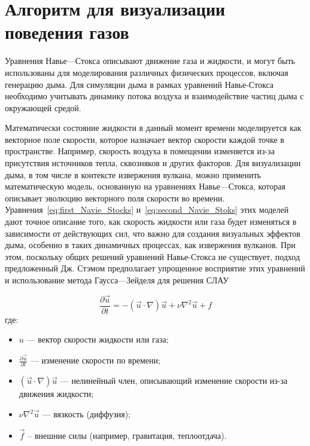 \section{Алгоритм для визуализации поведения газов}
Уравнения Навье---Стокса описывают движение газа и жидкости, и могут быть использованы для моделирования различных физических процессов, включая генерацию дыма. Для симуляции дыма в рамках уравнений Навье-Стокса необходимо учитывать динамику потока воздуха и взаимодействие частиц дыма с окружающей средой.

Математически состояние жидкости в данный момент времени моделируется как векторное поле скорости, которое назначает вектор скорости каждой точке в пространстве. Например, скорость воздуха в помещении изменяется из-за присутствия источников тепла, сквозняков и других факторов. Для визуализации дыма, в том числе в контексте извержения вулкана, можно применить математическую модель, основанную на уравнениях Навье---Стокса, которая описывает эволюцию векторного поля скорости во времени. Уравнения~\ref{eq:first_Navie_Stocks} и~\ref{eq:second_Navie_Stoks} этих моделей дают точное описание того, как скорость жидкости или газа будет изменяться в зависимости от действующих сил, что важно для создания визуальных эффектов дыма, особенно в таких динамичных процессах, как извержения вулканов. При этом, поскольку общих решений уравнений Навье-Стокса не существует, подход предложенный Дж. Стэмом предполагает упрощенное восприятие этих уравнений и использование метода Гаусса---Зейделя для решения СЛАУ~\cite{lit3, stam, Gauss} 

\begin{equation}
	\label{eq:first_Navie_Stocks}
	\frac{\partial \vec{u}}{\partial t} = - (\vec{u} \cdot \nabla) \vec{u} + \nu \nabla^2 \vec{u} + f
\end{equation}
где:
\begin{itemize}
	\item $u$ --- вектор скорости жидкости или газа;
	\item $\frac{\partial \vec{u}}{\partial t}$ --- изменение скорости по времени;
	\item $(\vec{u} \cdot \nabla) \vec{u}$ --- нелинейный член, описывающий изменение скорости из-за движения жидкости;
	\item \(\nu \nabla^2 \vec{u}\) --- вязкость (диффузия);
	\item \(\vec{f}\) -- внешние силы (например, гравитация, теплоотдача).
\end{itemize}

